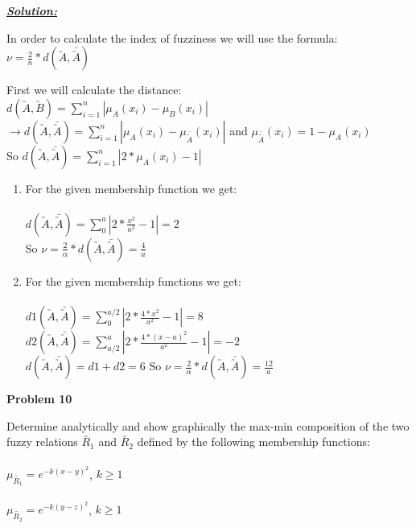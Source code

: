 \documentclass{article}
\begin{document}
\vspace{1cm}
\noindent \underline{\textbf{\textit{Solution:}}}

\noindent In order to calculate the index of fuzziness we will use the formula: $\nu = \frac{2}{n} * d(\utilde A,  \bar{ \utilde{ A}})$


\noindent First we will calculate the distance: \\ 
$d(\utilde A,\utilde B) = \sum_{i=1}^{n} | \mu_A(x_i) -  \mu_B(x_i)|$
  $\rightarrow d(\utilde A,\bar{ \utilde{ A}} ) = \sum_{i=1}^{n} | \mu_A(x_i) -  \mu_{\bar{ \utilde{ A}}}(x_i)|$ 
  and $\mu_{\bar{ \utilde{ A}}}(x_i) = 1 - \mu_A(x_i)$ \\
  So $ d(\utilde A,\bar{ \utilde{ A}} ) = \sum_{i=1}^{n} | 2* \mu_A(x_i) -  1| $ \\
\begin{enumerate} [label = \Alph*]
\item
  For the given membership function we get:\\ \\
  $ d(\utilde A,\bar{ \utilde{ A}} ) = \sum_{0}^{a} | 2* \frac{x^2}{a^2} -  1| = 2 $ \\
  So $\nu = \frac{2}{\alpha}* d(\utilde A,\bar{ \utilde{ A}} ) = \frac{4}{a}$

  \item For the given membership functions we get:\\ \\
  $ d1(\utilde A,\bar{ \utilde{ A}} ) = \sum_{0}^{a/2} | 2* \frac{4*x^2}{a^2} -  1| = 8 $ \\
  $ d2(\utilde A,\bar{ \utilde{ A}} ) = \sum_{a/2}^{a} | 2* \frac{4*(x-a)^2}{a^2} -  1| = -2 $ \\
  $ d(\utilde A,\bar{ \utilde{ A}} ) = d1 + d2 = 6 $
  So $\nu = \frac{2}{\alpha}* d(\utilde A,\bar{ \utilde{ A}} ) = \frac{12}{a}$

\end{enumerate}



\newpage
\noindent \textbf{Problem 10}

\noindent Determine analytically and show graphically the max-min composition of the two fuzzy 
relations $\utilde{R_1}$ and $\utilde{R_2}$ defined by the following membership functions:\\ \\ $\mu_{\utilde{R_1}} = e^{-k(x-y)^2}$, $k \geq 1$
\\ \\ $\mu_{\utilde{R_2}} = e^{-k(y-z)^2}$, $k \geq 1$
\end{document}
